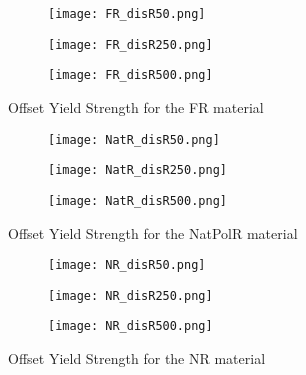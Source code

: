 \newpage
\begin{figure}[H]
    \vspace*{-2em}
    \centering
    \begin{subfigure}[b]{0.65\textwidth}
        \centering
        \texttt{[image: FR\_disR50.png]}
        \caption{}
        \label{fig:FR50}
    \end{subfigure}
    \begin{subfigure}[b]{0.65\textwidth}
        \centering
        \texttt{[image: FR\_disR250.png]}
        \caption{}
        \label{fig:FR250}
    \end{subfigure}
    \begin{subfigure}[b]{0.65\textwidth}
        \centering
        \texttt{[image: FR\_disR500.png]}
        \caption{}
        \label{fig:FR500}
    \end{subfigure}
    \caption{Offset Yield Strength for the FR material}
    \label{fig:FRoff}
\end{figure}
\newpage
\begin{figure}[H]
    \vspace*{-2em}
    \centering
    \begin{subfigure}[b]{0.65\textwidth}
        \centering
        \texttt{[image: NatR\_disR50.png]}
        \caption{}
        \label{fig:NatR50}
    \end{subfigure}
    \begin{subfigure}[b]{0.65\textwidth}
        \centering
        \texttt{[image: NatR\_disR250.png]}
        \caption{}
        \label{fig:NatR250}
    \end{subfigure}
    \begin{subfigure}[b]{0.65\textwidth}
        \centering
        \texttt{[image: NatR\_disR500.png]}
        \caption{}
        \label{fig:NatR500}
    \end{subfigure}
    \caption{Offset Yield Strength for the NatPolR material}
    \label{fig:NatRoff}
\end{figure}
\newpage
\begin{figure}[H]
    \vspace*{-2em}
    \centering
    \begin{subfigure}[b]{0.65\textwidth}
        \centering
        \texttt{[image: NR\_disR50.png]}
        \caption{}
        \label{fig:NR50}
    \end{subfigure}
    \begin{subfigure}[b]{0.65\textwidth}
        \centering
        \texttt{[image: NR\_disR250.png]}
        \caption{}
        \label{fig:NR250}
    \end{subfigure}
    \begin{subfigure}[b]{0.65\textwidth}
        \centering
        \texttt{[image: NR\_disR500.png]}
        \caption{}
        \label{fig:NR500}
    \end{subfigure}
    \caption{Offset Yield Strength for the NR material}
    \label{fig:NRoff}
\end{figure}
